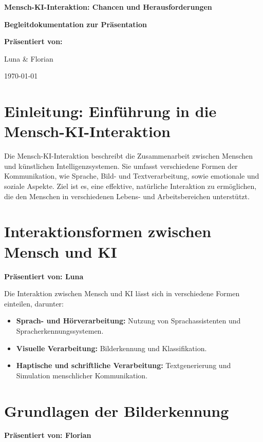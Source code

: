 \documentclass[a4paper,12pt]{article}
\begin{document}
\begin{titlepage}
    \centering
    \vspace*{1.5cm}
    \Huge\textbf{Mensch-KI-Interaktion: Chancen und Herausforderungen}

    \vspace{1cm}
    \Large\textbf{Begleitdokumentation zur Präsentation}

    \vspace{2cm}
    \textbf{Präsentiert von:}

    \vspace{0.5cm}
    \large
    Luna \& Florian

    \vfill
    \large \today
\end{titlepage}

\tableofcontents
\newpage

\section{Einleitung: Einführung in die Mensch-KI-Interaktion}
Die Mensch-KI-Interaktion beschreibt die Zusammenarbeit zwischen Menschen und künstlichen Intelligenzsystemen. Sie umfasst verschiedene Formen der Kommunikation, wie Sprache, Bild- und Textverarbeitung, sowie emotionale und soziale Aspekte. Ziel ist es, eine effektive, natürliche Interaktion zu ermöglichen, die den Menschen in verschiedenen Lebens- und Arbeitsbereichen unterstützt.

\section{Interaktionsformen zwischen Mensch und KI}
\textbf{Präsentiert von: Luna}

Die Interaktion zwischen Mensch und KI lässt sich in verschiedene Formen einteilen, darunter:
\begin{itemize}
    \item \textbf{Sprach- und Hörverarbeitung:} Nutzung von Sprachassistenten und Spracherkennungssystemen.
    \item \textbf{Visuelle Verarbeitung:} Bilderkennung und Klassifikation.
    \item \textbf{Haptische und schriftliche Verarbeitung:} Textgenerierung und Simulation menschlicher Kommunikation.
\end{itemize}

\section{Grundlagen der Bilderkennung}
\textbf{Präsentiert von: Florian}
\end{document}
